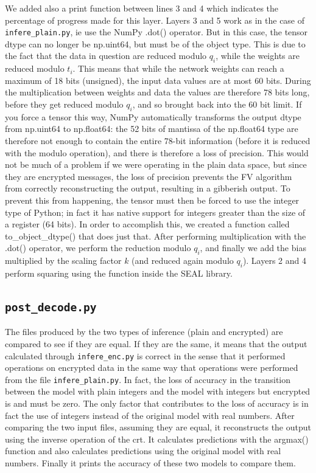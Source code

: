 We added also a print function between lines 3 and 4 which indicates the percentage of progress made for this layer. Layers 3 and 5 work as in the case of \texttt{infere_plain.py}, ie use the NumPy .dot() operator. But in this case, the tensor dtype can no longer be np.uint64, but must be of the object type. This is due to the fact that the data in question are reduced modulo $q_i$, while the weights are reduced modulo $t_i$. This means that while the network weights can reach a maximum of 18 bits (unsigned), the input data values are at most 60 bits. During the multiplication between weights and data the values are therefore 78 bits long, before they get reduced modulo $q_i$, and so brought back into the 60 bit limit. If you force a tensor this way, NumPy automatically transforms the output dtype from np.uint64 to np.float64: the 52 bits of mantissa of the np.float64 type are therefore not enough to contain the entire 78-bit information (before it is reduced with the modulo operation), and there is therefore a loss of precision. This would not be much of a problem if we were operating in the plain data space, but since they are encrypted messages, the loss of precision prevents the FV algorithm from correctly reconstructing the output, resulting in a gibberish output. To prevent this from happening, the tensor must then be forced to use the integer type of Python; in fact it has native support for integers greater than the size of a register (64 bits). In order to accomplish this, we created a function called to_object_dtype() that does just that. After performing multiplication with the .dot() operator, we perform the reduction modulo $q_i$, and finally we add the bias multiplied by the scaling factor $k$ (and reduced again modulo $q_i$). Layers 2 and 4 perform squaring using the function inside the SEAL library.

\subsection{\texttt{post_decode.py}}

The files produced by the two types of inference (plain and encrypted) are compared to see if they are equal. If they are the same, it means that the output calculated through \texttt{infere_enc.py} is correct in the sense that it performed operations on encrypted data in the same way that operations were performed from the file \texttt{infere_plain.py}. In fact, the loss of accuracy in the transition between the model with plain integers and the model with integers but encrypted is and must be zero. The only factor that contributes to the loss of accuracy is in fact the use of integers instead of the original model with real numbers. After comparing the two input files, assuming they are equal, it reconstructs the output using the inverse operation of the crt. It calculates predictions with the argmax() function and also calculates predictions using the original model with real numbers. Finally it prints the accuracy of these two models to compare them.
